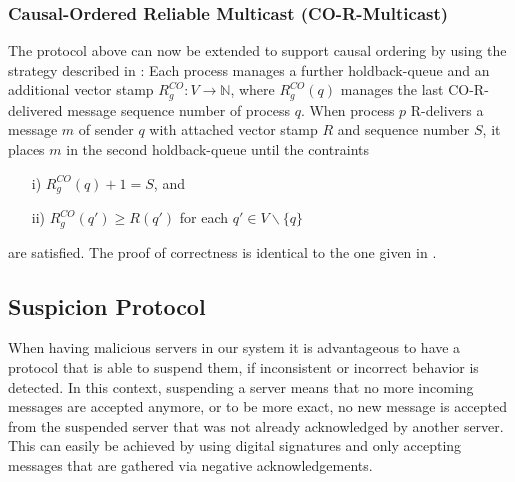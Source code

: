 \documentclass[runningheads]{llncs}
\begin{document}
\subsubsection{Causal-Ordered Reliable Multicast (CO-R-Multicast)}
The protocol above can now be extended to support causal ordering by using the strategy described in \cite[p.~657-658]{ds_book}: Each process manages a further holdback-queue and an additional vector stamp $R_g^{CO}: V \rightarrow \mathbb{N}$, where $R_g^{CO}(q)$ manages the last CO-R-delivered message sequence number of process $q$. When process $p$ R-delivers a message $m$ of sender $q$ with attached vector stamp $R$ and sequence number $S$, it places $m$ in the second holdback-queue until the contraints
\begin{enumerate}
    \item[i)] $R_g^{CO}(q) + 1 = S$, and 
    \item[ii)] $R_g^{CO}(q') \geq R(q')$ for each $q' \in V \backslash \{q\}$
\end{enumerate}
are satisfied. The proof of correctness is identical to the one given in \cite[p.~658]{ds_book}.

\subsection{Suspicion Protocol} \label{sec:suspicion}
When having malicious servers in our system it is advantageous to have a protocol that is able to suspend them, if inconsistent or incorrect behavior is detected. In this context, suspending a server means that no more incoming messages are accepted anymore, or to be more exact, no new message is accepted from the suspended server that was not already acknowledged by another server. This can easily be achieved by using digital signatures and only accepting messages that are gathered via negative acknowledgements. 
\end{document}
